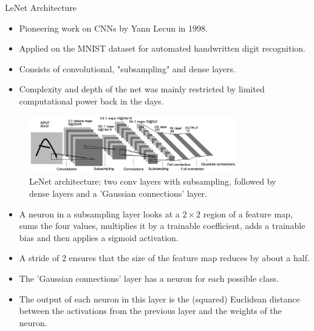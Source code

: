 \begin{vbframe}{LeNet Architecture}
  \begin{itemize}
    \item Pioneering work on CNNs by Yann Lecun in 1998. 
    \item Applied on the MNIST dataset for automated handwritten digit recognition.
    \item Consists of convolutional, "subsampling" and dense layers.
    \item Complexity and depth of the net was mainly restricted by limited computational power back in the days.
  \end{itemize}
  \begin{figure}
  \centering
    \includegraphics[width=9cm]{plots/architectures/lenet.png}
    \caption{LeNet architecture: two conv layers with subsampling, followed by dense layers and a 'Gaussian connections' layer.}
  \end{figure}
  \framebreak
  \begin{itemize}
    \item A neuron in a subsampling layer looks at a $2 \times 2$ region of a feature map, sums the four values, multiplies it by a trainable coefficient, adds a trainable bias and then applies a sigmoid activation.
    \item A stride of 2 ensures that the size of the feature map reduces by about a half.
    \item The 'Gaussian connections' layer has a neuron for each possible class. 
    \item The output of each neuron in this layer is the (squared) Euclidean distance between the activations from the previous layer and the weights of the neuron.
  \end{itemize}   
\end{vbframe}

